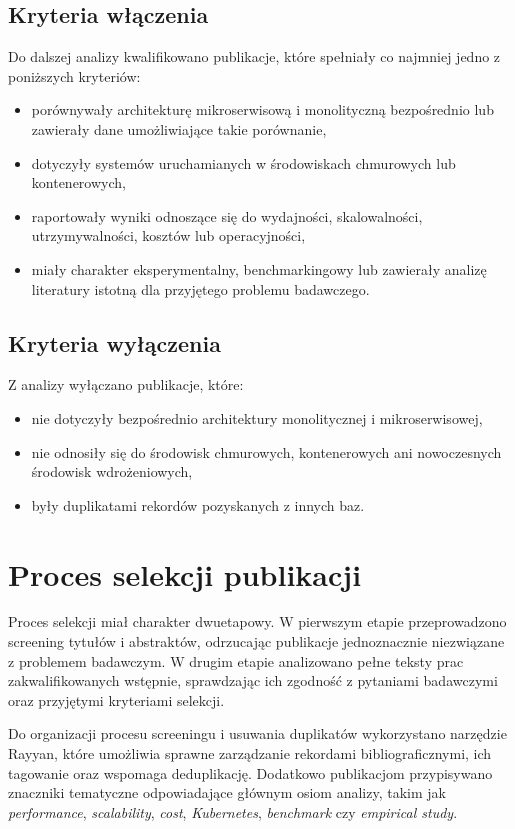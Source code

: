 \subsection{Kryteria włączenia}

Do dalszej analizy kwalifikowano publikacje, które spełniały co najmniej jedno z poniższych kryteriów:
\begin{itemize}
    \item porównywały architekturę mikroserwisową i monolityczną bezpośrednio lub zawierały dane umożliwiające takie porównanie,
    \item dotyczyły systemów uruchamianych w środowiskach chmurowych lub kontenerowych,
    \item raportowały wyniki odnoszące się do wydajności, skalowalności, utrzymywalności, kosztów lub operacyjności,
    \item miały charakter eksperymentalny, benchmarkingowy lub zawierały analizę literatury istotną dla przyjętego problemu badawczego.
\end{itemize}

\subsection{Kryteria wyłączenia}

Z analizy wyłączano publikacje, które:
\begin{itemize}
    \item nie dotyczyły bezpośrednio architektury monolitycznej i mikroserwisowej,
    \item nie odnosiły się do środowisk chmurowych, kontenerowych ani nowoczesnych środowisk wdrożeniowych,
    \item były duplikatami rekordów pozyskanych z innych baz.
\end{itemize}


\section{Proces selekcji publikacji}

Proces selekcji miał charakter dwuetapowy. W pierwszym etapie przeprowadzono screening tytułów i abstraktów, odrzucając publikacje jednoznacznie niezwiązane z problemem badawczym. W drugim etapie analizowano pełne teksty prac zakwalifikowanych wstępnie, sprawdzając ich zgodność z pytaniami badawczymi oraz przyjętymi kryteriami selekcji.

Do organizacji procesu screeningu i usuwania duplikatów wykorzystano narzędzie Rayyan, które umożliwia sprawne zarządzanie rekordami bibliograficznymi, ich tagowanie oraz wspomaga deduplikację. Dodatkowo publikacjom przypisywano znaczniki tematyczne odpowiadające głównym osiom analizy, takim jak \textit{performance}, \textit{scalability}, \textit{cost}, \textit{Kubernetes}, \textit{benchmark} czy \textit{empirical study}.

